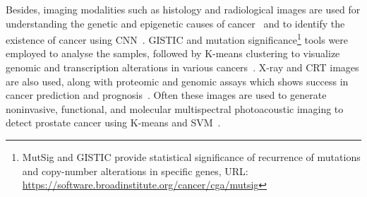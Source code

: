 \hspace*{3.5mm} Besides, imaging modalities such as histology and radiological images are used for understanding the genetic and epigenetic causes of cancer~\cite{20Rajanna,23Zheng} and to identify the existence of cancer using CNN~\cite{19Cruz,xu}. GISTIC and mutation significance\footnote{MutSig and GISTIC provide statistical significance of recurrence of mutations and copy-number alterations in specific genes, URL: \url{https://software.broadinstitute.org/cancer/cga/mutsig}} tools were employed to analyse the samples, followed by K-means clustering to visualize genomic and transcription alterations in various cancers~\cite{wb}. X-ray and CRT images are also used, along with proteomic and genomic assays which shows success in cancer prediction and prognosis~\cite{28Zhou}. Often these images are used to generate noninvasive, functional, and molecular multispectral photoacoustic imaging to detect prostate cancer using K-means and SVM~\cite{23Zheng}. %

